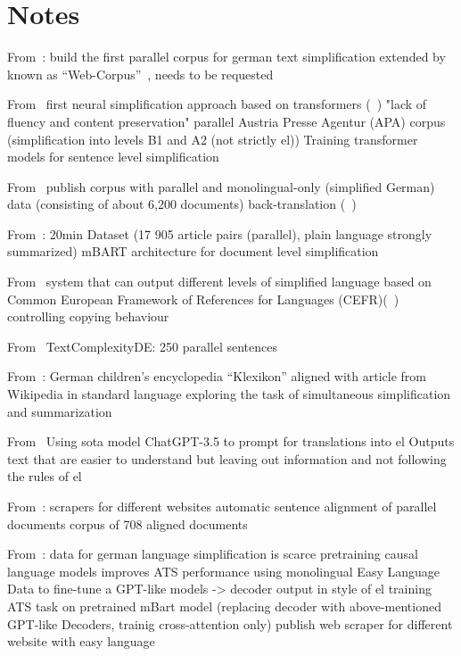 \section{Notes}\label{sec:notes}

From~\autocite{klaper-etal-2013-building}:
build the first parallel corpus for german text simplification
extended by ~\autocite{battisti-etal-2020-corpus}
known as \enquote{Web-Corpus}~\autocite{ebeling2022}, needs to be requested


From~\autocite{sauberli-etal-2020-benchmarking}
first neural simplification approach based on transformers (~\autocite{Ansch_tz_2023})
"lack of fluency and content preservation"
parallel Austria Presse Agentur (APA) corpus (simplification into levels B1 and A2 (not strictly \gls{el}))
Training transformer models for sentence level simplification

From~\autocite{battisti-etal-2020-corpus}
publish corpus with parallel and monolingual-only (simplified German) data (consisting of about 6,200 documents)
back-translation (~\autocite{sennrich-etal-2016-improving})

From~\autocite{rios-etal-2021-new}:
20min Dataset (17 905 article pairs (parallel), plain language strongly summarized)
mBART architecture for document level simplification

From~\autocite{spring-etal-2021-exploring}
system that can output different levels of simplified language based on
Common European Framework of References for Languages (CEFR)(~\autocite{Ansch_tz_2023})
controlling copying behaviour

From~\autocite{naderi2019subjective}
TextComplexityDE: 250 parallel sentences

From~\autocite{aumiller2022klexikon}:
German children’s encyclopedia \enquote{Klexikon} aligned with article from Wikipedia in standard language
exploring the task of simultaneous simplification and summarization

From~\autocite{deilen2023using}
Using sota model ChatGPT-3.5 to prompt for translations into \gls{el}
Outputs text that are easier to understand but leaving out information and not following the rules of \gls{el}

From~\autocite{toborek2023new}:
scrapers for different websites
automatic sentence alignment of parallel documents
corpus of 708 aligned documents


From~\autocite{Ansch_tz_2023}:
data for german language simplification is scarce
pretraining causal language models improves ATS performance
using monolingual Easy Language Data to fine-tune a GPT-like models
-> decoder output in style of \gls{el}
training ATS task on pretrained mBart model (replacing decoder with above-mentioned GPT-like Decoders, trainig cross-attention only)
publish web scraper for different website with easy language

